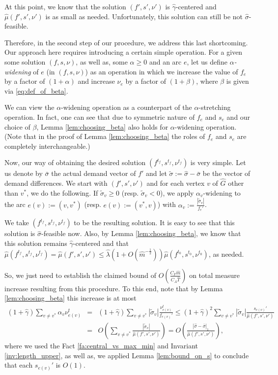 \documentclass[11pt, letterpaper]{article}
\newcommand{\cfreeze}{C_{F}}
\newcommand{\cauxiliary}{C_{A}}
\newcommand{\onorm}[1]{|#1|_{1}}
\newcommand{\hG}{\widehat{G}}
\newcommand{\hm}{\widehat{m}}
\newcommand{\hT}{\widehat{T}}
\newcommand{\hmu}{\hat{\mu}}
\newcommand{\hgamma}{\hat{\gamma}}
\newcommand{\hlambda}{\hat{\lambda}}
\newcommand{\vnu}{\boldsymbol{\mathit{\nu}}}
\newcommand{\ovsigma}{\boldsymbol{\mathit{\bar{\sigma}}}}
\newcommand{\tvsigma}{\boldsymbol{\mathit{\tilde{\sigma}}}}
\newcommand{\hvsigma}{\boldsymbol{\mathit{\hat{\sigma}}}}
\newcommand{\tsigma}{\tilde{\sigma}}
\newcommand{\ff}{\boldsymbol{\mathit{f}}}
\renewcommand{\ss}{\boldsymbol{\mathit{s}}}
\begin{document}
At this point, we know that the solution $(\ff',\ss',\vnu')$ is $\hgamma$-centered and $\hmu(\ff',\ss',\vnu')$ is as small as needed. Unfortunately, this solution can still be not $\hvsigma$-feasible. 

Therefore, in the second step of our procedure, we address this last shortcoming. Our approach here requires introducing a certain simple operation. For a given some solution $(\ff,\ss,\vnu)$, as well as, some $\alpha\geq 0$ and an arc $e$, let us define {\em $\alpha$-widening} of $e$ (in $(\ff,\ss,\vnu)$) as an operation in which we increase the value of $f_e$ by a factor of $(1+\alpha)$ and increase $\nu_e$ by a factor of $(1+\beta)$, where $\beta$ is given via \eqref{eq:def_of_beta}.

We can view the $\alpha$-widening operation as a counterpart of the $\alpha$-stretching operation. In fact, one can see that due to symmetric nature of $f_e$ and $s_e$ and our choice of $\beta$, Lemma \ref{lem:choosing_beta} also holds for $\alpha$-widening operation. (Note that in the proof of Lemma \ref{lem:choosing_beta} the roles of $f_e$ and $s_e$ are completely interchangeable.)

Now, our way of obtaining the desired solution $(\ff^{t_f},\ss^{t_f},\vnu^{t_f})$ is very simple. Let us denote by $\ovsigma$ the actual demand vector of $\ff'$ and let $\tvsigma:=\hvsigma-\ovsigma$ be the vector of demand differences. We start with $(\ff',\ss',\vnu')$ and for each vertex $v$ of $\hG$ other than $v^*$, we do the following. If $\tsigma_v\geq 0$ (resp. $\tsigma_v<0$), we apply $\alpha_v$-widening to the arc $e(v):=(v,v^*)$ (resp. $e(v):=(v^*,v)$) with $\alpha_v:=\frac{|\tsigma_v|}{f_e'}$. 

We take $(\ff^{t_f},\ss^{t_f},\vnu^{t_f})$ to be the resulting solution. It is easy to see that this solution is $\hvsigma$-feasible now. Also, by Lemma \ref{lem:choosing_beta}, we know that this solution remains $\hgamma$-centered and that $\hmu(\ff^{t_f},\ss^{t_f},\vnu^{t_f})=\hmu(\ff',\ss',\vnu')\leq\hlambda (1+O(\hm^{-\frac{1}{2}}))\hmu(\ff^{t_0},\ss^{t_0},\vnu^{t_0})$, as needed.

So, we just need to establish the claimed bound of $O(\frac{\cfreeze\hm}{\cauxiliary \hT})$ on total measure increase resulting from this procedure. To this end, note that by Lemma \ref{lem:choosing_beta} this increase is at most
\begin{eqnarray*}
(1+\hgamma) \sum_{v\neq v^*} \alpha_v \nu_{e(v)}^t & = &  (1+\hgamma) \sum_{v\neq v^*} |\tsigma_v| \frac{\nu_{e(v)}^t}{f_{e(v)}'} \leq (1+\hgamma)^2 \sum_{v\neq v^*} |\tsigma_v| \frac{s_{e(v)}'}{\hmu(\ff',\ss',\vnu')} \\
&=& O\left(\sum_{v\neq v^*}  \frac{|\tsigma_v|}{\hmu(\ff',\ss',\vnu')}\right)=O\left(\frac{\onorm{\hvsigma-\ovsigma}}{\hmu(\ff',\ss',\vnu')}\right),
\end{eqnarray*}
where we used the Fact \ref{fa:central_vs_max_min} and Invariant \ref{inv:length_upper}, as well as, we applied Lemma \ref{lem:bound_on_s} to conclude that each $s_{e(v)}'$ is $O(1)$. 
\end{document}
